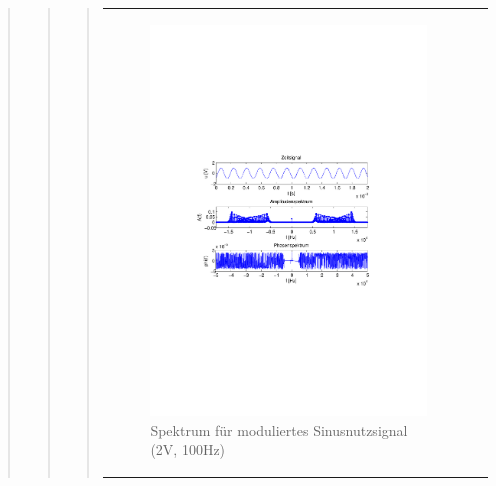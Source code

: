 \begin{quote}
\begin{quote}
\begin{quote}
\begin{center}
\begin{tabular}{ll}
\begin{minipage}{0.6\textwidth}
                \end{minipage}
                \begin{minipage}{0.6\textwidth}

                     \begin{figure}[H]
                        \label{fig:}
                        \includegraphics[scale=0.5, trim = 2cm 6.5cm 1.5cm
                        8.5cm, clip]{./Bilder/sin_a2_f100}
                        \caption{Spektrum für moduliertes Sinusnutzsignal (2V,
                        100Hz)}
                    \end{figure}
               \vspace{-1.5em}

                \end{minipage}


\end{tabular}
\end{center}
\end{quote}
\end{quote}
\end{quote}
